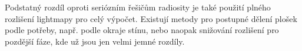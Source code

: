 \documentclass[czech]{pyt-report}
\begin{document}
Podstatný rozdíl oproti seriózním řešičům radiosity je také použití plného rozlišení lightmapy pro celý výpočet. Existují metody pro postupné dělení plošek podle potřeby, např. podle okraje stínu, nebo naopak snižování rozlišení pro pozdější fáze, kde už jsou jen velmi jemné rozdíly.

%

\end{document}
